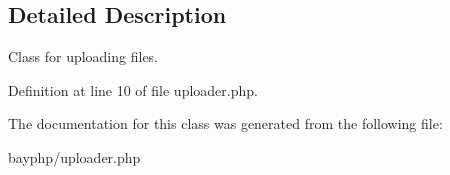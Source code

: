 \subsection{Detailed Description}
Class for uploading files. 

Definition at line 10 of file uploader.php.



The documentation for this class was generated from the following file:\begin{DoxyCompactItemize}
\item 
bayphp/uploader.php\end{DoxyCompactItemize}
